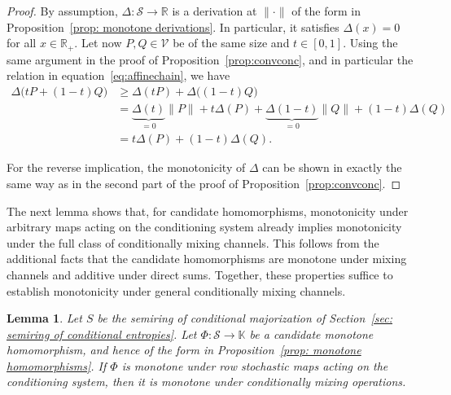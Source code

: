 \documentclass[aps,pra,11pt,onecolumn,nofootinbib,tightenlines]{revtex4-2}
\newtheorem{lemma}[theorem]{Lemma}
\theoremstyle{definition}
\newcommand{\cS}{\mathcal{S}}
\newcommand{\V}{\mathcal{V}}
\newcommand{\mb}[1]{\mathbb{#1}}
\begin{document}
\begin{proof}
By assumption, $\Delta:\cS\to\mb R$ is a derivation at $\|\cdot\|$ of the form in Proposition~\ref{prop: monotone derivations}. In particular, it satisfies $\Delta(x)=0$ for all $x\in\mb R_+$. Let now $P,Q\in\V$ be of the same size and $t\in[0,1]$. Using the same argument in the proof of Proposition~\ref{prop:convconc}, and in particular the relation in equation~\eqref{eq:affinechain}, we have
\begin{align}
\Delta\big(tP+(1-t)Q\big)&\geq\Delta(tP)+\Delta\big((1-t)Q\big)\\
&=\underbrace{\Delta(t)}_{=0}\|P\|+t\Delta(P)+\underbrace{\Delta(1-t)}_{=0}\|Q\|+(1-t)\Delta(Q)\\
&=t\Delta(P)+(1-t)\Delta(Q).
\end{align}

For the reverse implication, the monotonicity of $\Delta$ can be shown in exactly the same way as in the second part of the proof of Proposition~\ref{prop:convconc}.
\end{proof}

The next lemma shows that, for candidate homomorphisms, monotonicity under arbitrary maps acting on the conditioning system already implies monotonicity under the full class of conditionally mixing channels. This follows from the additional facts that the candidate homomorphisms are monotone under mixing channels and additive under direct sums. Together, these properties suffice to establish monotonicity under general conditionally mixing channels. 
\begin{lemma}
\label{lem: extension to general channels}
Let $S$ be the semiring of conditional majorization of Section~\ref{sec: semiring of conditional entropies}.
Let $\Phi: \cS \to \mathbb{K}$ be a candidate monotone homomorphism, and hence of the form in Proposition~\ref{prop: monotone homomorphisms}. If $\Phi$ is monotone under row stochastic maps acting on the conditioning system, then it is monotone under conditionally mixing operations.
\end{lemma}
\end{document}

